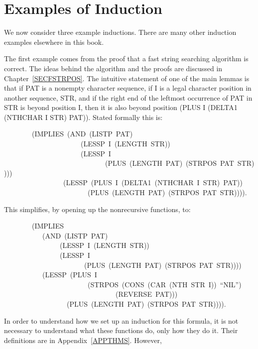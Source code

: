 \documentclass[10pt]{book}
\newenvironment{pubasis}{\begin{flushleft}}{\end{flushleft}}
\begin{document}
\section{Examples of Induction}
We now consider three example inductions.  There are many
other induction examples elsewhere in this book.

The first example comes from the proof that a fast string searching
algorithm is correct.  The ideas behind the algorithm and the
proofs are discussed in Chapter~\ref{SECFSTRPOS}.  The intuitive
statement of one of the main lemmas is that if PAT is a nonempty
character sequence, if I is a legal character position in another sequence, STR,
and if the right end of the leftmost occurrence of PAT in STR
is beyond position I, then it is also beyond position (PLUS I (DELTA1 (NTHCHAR I STR) PAT)).
Stated formally this is:
\begin{pubasis}
~~~~~~~~(IMPLIES~(AND~(LISTP~PAT)\\
~~~~~~~~~~~~~~~~~~~~~~(LESSP~I~(LENGTH~STR))\\
~~~~~~~~~~~~~~~~~~~~~~(LESSP~I\\
~~~~~~~~~~~~~~~~~~~~~~~~~~~~~(PLUS~(LENGTH~PAT)~(STRPOS~PAT~STR))))\\
~~~~~~~~~~~~~~~~~(LESSP~(PLUS~I~(DELTA1~(NTHCHAR~I~STR)~PAT))\\
~~~~~~~~~~~~~~~~~~~~~~~~(PLUS~(LENGTH~PAT)~(STRPOS~PAT~STR)))).\\
\end{pubasis}
This simplifies, by opening up the nonrecursive functions, to:
\begin{pubasis}
~~~~~~~~(IMPLIES\\
~~~~~~~~~~~(AND~(LISTP~PAT)\\
~~~~~~~~~~~~~~~~(LESSP~I~(LENGTH~STR))\\
~~~~~~~~~~~~~~~~(LESSP~I\\
~~~~~~~~~~~~~~~~~~~~~~~(PLUS~(LENGTH~PAT)~(STRPOS~PAT~STR))))\\
~~~~~~~~~~~(LESSP~(PLUS~I\\
~~~~~~~~~~~~~~~~~~~~~~~~(STRPOS~(CONS~(CAR~(NTH~STR~I))~``NIL'')\\
~~~~~~~~~~~~~~~~~~~~~~~~~~~~~~~~(REVERSE~PAT)))\\
~~~~~~~~~~~~~~~~~~(PLUS~(LENGTH~PAT)~(STRPOS~PAT~STR)))).\\
\end{pubasis}
In order to understand how we set up an induction for this formula,
it is not necessary to understand what these functions
do, only how they do it.  Their definitions are in Appendix~\ref{APPTHMS}.  However,
\end{document}
